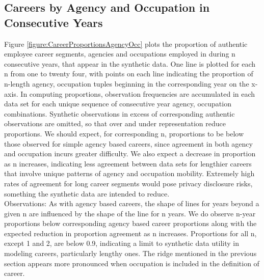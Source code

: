 \documentclass[10pt, letterpaper]{article}
\begin{document}
\begin{spacing}{1.0}
\clearpage

\subsection{Careers by Agency and Occupation in Consecutive Years}

Figure \ref{figure:CareerProportionsAgencyOcc} plots the proportion of authentic employee career segments, agencies and occupations employed in during n consecutive years, that appear in the synthetic data.  One line is plotted for each n from one to twenty four, with points on each line indicating the proportion of n-length agency, occupation tuples beginning in the corresponding year on the x-axis.  In computing proportions, observation frequencies are accumulated in each data set for each unique sequence of consecutive year agency, occupation combinations.  Synthetic observations in excess of corresponding authentic observations are omitted, so that over and under representation reduce proportions.  We should expect, for corresponding n, proportions to be below those observed for simple agency based careers, since agreement in both agency and occupation incurs greater difficulty.  We also expect a decrease in proportion as n increases, indicating less agreement between data sets for lengthier careers that involve unique patterns of agency and occupation mobility.  Extremely high rates of agreement for long career segments would pose privacy disclosure risks, something the synthetic data are intended to reduce.\\

Observations:  As with agency based careers, the shape of lines for years beyond a given n are influenced by the shape of the line for n years.  We do observe n-year proportions below corresponding agency based career proportions along with the expected reduction in proportion agreement as n increases.  Proportions for all n, except 1 and 2, are below 0.9, indicating a limit to synthetic data utility in modeling careers, particularly lengthy ones.  The ridge mentioned in the previous section appears more pronounced when occupation is included in the definition of career.\\


\end{spacing}
\end{document}
